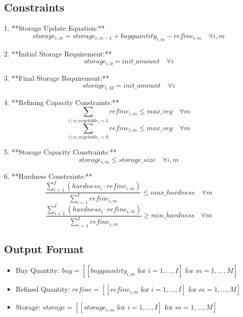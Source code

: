 \documentclass{article}
\begin{document}
\subsection*{Constraints}

1. **Storage Update Equation:**
   \[
   storage_{i,m} = storage_{i,m-1} + buyquantity_{i,m} - refine_{i,m} \quad \forall i, m
   \]

2. **Initial Storage Requirement:**
   \[
   storage_{i,0} = init\_amount \quad \forall i
   \]

3. **Final Storage Requirement:**
   \[
   storage_{i,M} = init\_amount \quad \forall i
   \]

4. **Refining Capacity Constraints:**
   \[
   \sum_{i \,|\, is\_vegetable_{i}=1} refine_{i,m} \leq max\_veg \quad \forall m
   \]
   \[
   \sum_{i \,|\, is\_vegetable_{i}=0} refine_{i,m} \leq max\_veg \quad \forall m
   \]

5. **Storage Capacity Constraints:**
   \[
   storage_{i,m} \leq storage\_size \quad \forall i, m
   \]

6. **Hardness Constraints:**
   \[
   \frac{\sum_{i=1}^{I} (hardness_{i} \cdot refine_{i,m})}{\sum_{i=1}^{I} refine_{i,m}} \leq max\_hardness \quad \forall m
   \]
   \[
   \frac{\sum_{i=1}^{I} (hardness_{i} \cdot refine_{i,m})}{\sum_{i=1}^{I} refine_{i,m}} \geq min\_hardness \quad \forall m
   \]

\subsection*{Output Format}
\begin{itemize}
    \item Buy Quantity: \( buy = [[buyquantity_{i,m} \text{ for } i=1,...,I] \text{ for } m=1,...,M] \)
    \item Refined Quantity: \( refine = [[refine_{i,m} \text{ for } i=1,...,I] \text{ for } m=1,...,M] \)
    \item Storage: \( storage = [[storage_{i,m} \text{ for } i=1,...,I] \text{ for } m=1,...,M] \)
\end{itemize}
\end{document}
